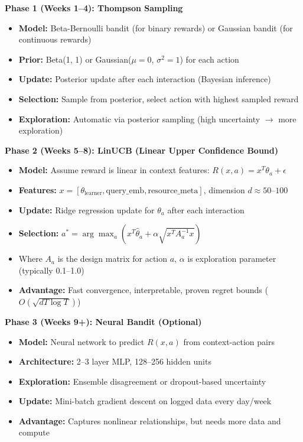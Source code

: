 \documentclass[11pt,letterpaper]{article}
\begin{document}
\textbf{Phase 1 (Weeks 1--4): Thompson Sampling}
\begin{itemize}
\item \textbf{Model:} Beta-Bernoulli bandit (for binary rewards) or Gaussian bandit (for continuous rewards)
\item \textbf{Prior:} Beta(1, 1) or Gaussian($\mu=0$, $\sigma^2=1$) for each action
\item \textbf{Update:} Posterior update after each interaction (Bayesian inference)
\item \textbf{Selection:} Sample from posterior, select action with highest sampled reward
\item \textbf{Exploration:} Automatic via posterior sampling (high uncertainty $\rightarrow$ more exploration)
\end{itemize}

\textbf{Phase 2 (Weeks 5--8): LinUCB (Linear Upper Confidence Bound)}
\begin{itemize}
\item \textbf{Model:} Assume reward is linear in context features: $R(x, a) = x^T \theta_a + \epsilon$
\item \textbf{Features:} $x = [\theta_{\text{learner}}, \text{query\_emb}, \text{resource\_meta}]$, dimension $d \approx 50$--$100$
\item \textbf{Update:} Ridge regression update for $\theta_a$ after each interaction
\item \textbf{Selection:} $a^* = \arg\max_a \left( x^T \hat{\theta}_a + \alpha \sqrt{x^T A_a^{-1} x} \right)$
\item Where $A_a$ is the design matrix for action $a$, $\alpha$ is exploration parameter (typically 0.1--1.0)
\item \textbf{Advantage:} Fast convergence, interpretable, proven regret bounds ($O(\sqrt{dT\log T})$)
\end{itemize}

\textbf{Phase 3 (Weeks 9+): Neural Bandit (Optional)}
\begin{itemize}
\item \textbf{Model:} Neural network to predict $R(x, a)$ from context-action pairs
\item \textbf{Architecture:} 2--3 layer MLP, 128--256 hidden units
\item \textbf{Exploration:} Ensemble disagreement or dropout-based uncertainty
\item \textbf{Update:} Mini-batch gradient descent on logged data every day/week
\item \textbf{Advantage:} Captures nonlinear relationships, but needs more data and compute
\end{itemize}
\end{document}
